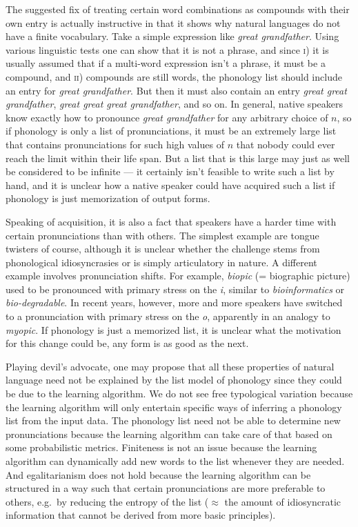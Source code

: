 The suggested fix of treating certain word combinations as compounds with their own entry is actually instructive in that it shows why natural languages do not have a finite vocabulary.
Take a simple expression like \emph{great grandfather}.
Using various linguistic tests one can show that it is not a phrase, and since \textsc{i}) it is usually assumed that if a multi-word expression isn't a phrase, it must be a compound, and \textsc{ii}) compounds are still words, the phonology list should include an entry for \emph{great grandfather}.
But then it must also contain an entry \emph{great great grandfather}, \emph{great great great grandfather}, and so on.
In general, native speakers know exactly how to pronounce \emph{great grandfather} for any arbitrary choice of $n$, so if phonology is only a list of pronunciations, it must be an extremely large list that contains pronunciations for such high values of $n$ that nobody could ever reach the limit within their life span.
But a list that is this large may just as well be considered to be infinite --- it certainly isn't feasible to write such a list by hand, and it is unclear how a native speaker could have acquired such a list if phonology is just memorization of output forms.

Speaking of acquisition, it is also a fact that speakers have a harder time with certain pronunciations than with others.
The simplest example are tongue twisters of course, although it is unclear whether the challenge stems from phonological idiosyncrasies or is simply articulatory in nature.
A different example involves pronunciation shifts.
For example, \emph{biopic} (= biographic picture) used to be pronounced with primary stress on the \emph{i}, similar to \emph{bioinformatics} or \emph{bio-degradable}.
In recent years, however, more and more speakers have switched to a pronunciation with primary stress on the \emph{o}, apparently in an analogy to \emph{myopic}.
If phonology is just a memorized list, it is unclear what the motivation for this change could be, any form is as good as the next.

Playing devil's advocate, one may propose that all these properties of natural language need not be explained by the list model of phonology since they could be due to the learning algorithm.
We do not see free typological variation because the learning algorithm will only entertain specific ways of inferring a phonology list from the input data.
The phonology list need not be able to determine new pronunciations because the learning algorithm can take care of that based on some probabilistic metrics.
Finiteness is not an issue because the learning algorithm can dynamically add new words to the list whenever they are needed.
And egalitarianism does not hold because the learning algorithm can be structured in a way such that certain pronunciations are more preferable to others, e.g.\ by reducing the entropy of the list ($\approx$ the amount of idiosyncratic information that cannot be derived from more basic principles).

